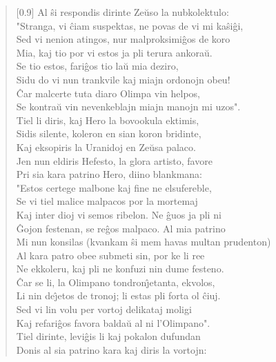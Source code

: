 \begin{verse}[0.9\textwidth]
          \vin   Al \^si respondis dirinte Ze\u uso la nubkolektulo:\\
          "Stranga, vi \^ciam suspektas, ne povas de vi mi ka\^si\^gi,\\
          Sed vi nenion atingos, nur malproksimi\^gos de koro\\
          Mia, kaj tio por vi estos ja pli terura ankora\u u.\\
          Se tio estos, fari\^gos tio la\u u mia deziro,\\
          Sidu do vi nun trankvile kaj miajn ordonojn obeu!\\
          \^Car malcerte tuta diaro Olimpa vin helpos,\\
          Se kontra\u u vin nevenkeblajn miajn manojn mi uzos".\\
          \vin   Tiel li diris, kaj Hero la bovookula ektimis,\\
          Sidis silente, koleron en sian koron bridinte,\\
          Kaj eksopiris la Uranidoj en Ze\u usa palaco.\\
          Jen nun eldiris Hefesto, la glora artisto, favore\\
          Pri sia kara patrino Hero, diino blankmana:\\
          \vin   "Estos certege malbone kaj fine ne elsufereble,\\
          Se vi tiel malice malpacos por la mortemaj\\
          Kaj inter dioj vi semos ribelon. Ne \^guos ja pli ni\\
          \^Gojon festenan, se re\^gos malpaco. Al mia patrino\\
          Mi nun konsilas (kvankam \^si mem havas multan prudenton)\\
          Al kara patro obee submeti sin, por ke li ree\\
          Ne ekkoleru, kaj pli ne konfuzi nin dume festeno.\\
          \^Car se li, la Olimpano tondron\^{\j}etanta, ekvolos,\\
          Li nin de\^{\j}etos de tronoj; li estas pli forta ol \^ciuj.\\
          Sed vi lin volu per vortoj delikataj moligi\\
          Kaj refari\^gos favora balda\u u al ni l'Olimpano".\\
          \vin   Tiel dirinte, levi\^gis li kaj pokalon dufundan\\
          Donis al sia patrino kara kaj diris la vortojn:\\

\end{verse}
